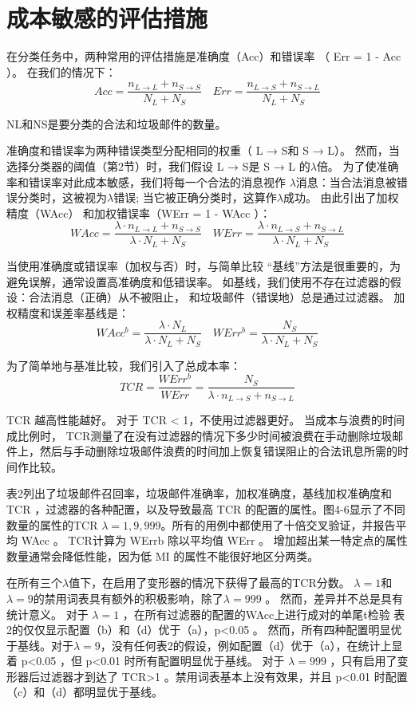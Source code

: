 \documentclass[UTF8]{ctexart}
\begin{document}
\section{成本敏感的评估措施}
在分类任务中，两种常用的评估措施是准确度（Acc）和错误率 （ Err = 1 - Acc ）。 在我们的情况下：$$Acc=\frac{n_{L \rightarrow L}+n_{S \rightarrow S}}{N_{L}+N_{S}} \quad E r r=\frac{n_{L \rightarrow S}+n_{S \rightarrow L}}{N_{L}+N_{S}}$$

NL和NS是要分类的合法和垃圾邮件的数量。

准确度和错误率为两种错误类型分配相同的权重（ L → S和  S → L）。 然而，当选择分类器的阈值（第2节）时，我们假设  L → S是 S → L 的$\lambda$倍。 为了使准确率和错误率对此成本敏感，我们将每一个合法的消息视作 $\lambda$消息：当合法消息被错误分类时，这被视为$\lambda$错误; 当它被正确分类时，这算作$ \lambda$成功。 由此引出了加权精度（WAcc） 和加权错误率（WErr = 1 - WAcc ）：$$W A c c=\frac{\lambda \cdot n_{L \rightarrow L}+n_{S \rightarrow S}}{\lambda \cdot N_{L}+N_{S}} \quad W E r r=\frac{\lambda \cdot n_{L \rightarrow S}+n_{S \rightarrow L}}{\lambda \cdot N_{L}+N_{S}}$$

当使用准确度或错误率（加权与否）时，与简单比较 “基线”方法是很重要的，为避免误解，通常设置高准确度和低错误率。 如基线，我们使用不存在过滤器的假设：合法消息（正确）从不被阻止， 和垃圾邮件（错误地）总是通过过滤器。 加权精度和误差率基线是：$$WAcc^{b}=\frac{\lambda \cdot N_{L}}{\lambda \cdot N_{L}+N_{S}} \quad W E r r^{b}=\frac{N_{S}}{\lambda \cdot N_{L}+N_{S}}$$

为了简单地与基准比较，我们引入了总成本率：$$TCR=\frac{W E r r^{b}}{W E r r}=\frac{N_{S}}{\lambda \cdot n_{L \rightarrow S}+n_{S \rightarrow L}}$$

TCR 越高性能越好。 对于 TCR < 1，不使用过滤器更好。 当成本与浪费的时间成比例时， TCR测量了在没有过滤器的情况下多少时间被浪费在手动删除垃圾邮件上，然后与手动删除垃圾邮件浪费的时间加上恢复错误阻止的合法讯息所需的时间作比较。

表2列出了垃圾邮件召回率，垃圾邮件准确率，加权准确度，基线加权准确度和 TCR ，过滤器的各种配置，以及导致最高 TCR 的配置的属性。图4-6显示了不同数量的属性的TCR  $\lambda=1,9,999$。所有的用例中都使用了十倍交叉验证，并报告平均 WAcc 。 TCR计算为  WErrb 除以平均值 WErr 。 增加超出某一特定点的属性数量通常会降低性能，因为低 MI 的属性不能很好地区分两类。

在所有三个$ \lambda$值下，在启用了变形器的情况下获得了最高的TCR分数。 $\lambda=1$和$\lambda=9$的禁用词表具有额外的积极影响，除了$\lambda=999$ 。 然而，差异并不总是具有统计意义。 对于 $\lambda=1$ ，在所有过滤器的配置的WAcc上进行成对的单尾t检验 表2的仅仅显示配置（b）和（d）优于（a），p<0.05 。 然而，所有四种配置明显优于基线。对于$\lambda=9$，没有任何表2的假设，例如配置（d）优于（a），在统计上显着  p<0.05 ，但 p<0.01 时所有配置明显优于基线。 对于 $\lambda=999$ ，只有启用了变形器后过滤器才到达了 TCR>1 。禁用词表基本上没有效果，并且 p<0.01 时配置（c）和（d）都明显优于基线。 
\end{document}
